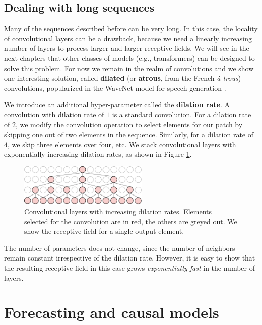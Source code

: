 \subsection{Dealing with long sequences}

Many of the sequences described before can be very long. In this case, the locality of convolutional layers can be a drawback, because we need a linearly increasing number of layers to process larger and larger receptive fields. We will see in the next chapters that other classes of models (e.g., transformers) can be designed to solve this problem. For now we remain in the realm of convolutions and we show one interesting solution, called \textbf{dilated} (or \textbf{atrous}, from the French \textit{à trous}) convolutions, popularized in the WaveNet model for speech generation \cite{oord2016wavenet}.

We introduce an additional hyper-parameter called the \textbf{dilation rate}. A convolution with dilation rate of $1$ is a standard convolution. For a dilation rate of $2$, we modify the convolution operation to select elements for our patch by skipping one out of two elements in the sequence. Similarly, for a dilation rate of $4$, we skip three elements over four, etc. We stack convolutional layers with exponentially increasing dilation rates, as shown in Figure \ref{fig:convolution_with_dilation}.

\begin{figure}
    \centering
    \hspace{1em}\includegraphics[width=0.55\textwidth]{images/convolution_with_dilation}
    \caption{Convolutional layers with increasing dilation rates. Elements selected for the convolution are in red, the others are greyed out. We show the receptive field for a single output element.}
    \label{fig:convolution_with_dilation}
\end{figure}

The number of parameters does not change, since the number of neighbors remain constant irrespective of the dilation rate. However, it is easy to show that the resulting receptive field in this case grows \textit{exponentially fast} in the number of layers.

\section{Forecasting and causal models}
